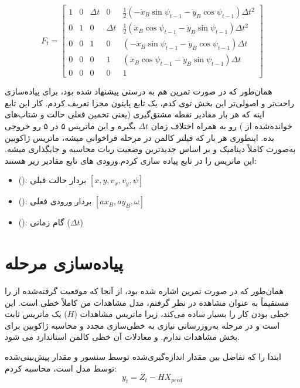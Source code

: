 \documentclass[12pt,a4paper]{article}
\begin{document}
$$F_t = \begin{bmatrix}
	1 & 0 & \Delta t & 0 & \frac{1}{2}(-\ddot{x}_B\sin\psi_{t-1} - \ddot{y}_B\cos\psi_{t-1})\Delta t^2 \\
	0 & 1 & 0 & \Delta t & \frac{1}{2}(\ddot{x}_B\cos\psi_{t-1} - \ddot{y}_B\sin\psi_{t-1})\Delta t^2 \\
	0 & 0 & 1 & 0 & (-\ddot{x}_B\sin\psi_{t-1} - \ddot{y}_B\cos\psi_{t-1})\Delta t \\
	0 & 0 & 0 & 1 & (\ddot{x}_B\cos\psi_{t-1} - \ddot{y}_B\sin\psi_{t-1})\Delta t \\
	0 & 0 & 0 & 0 & 1
\end{bmatrix}$$

همان‌طور که در صورت تمرین هم به درستی پیشنهاد شده بود، برای پیاده‌سازی راحت‌تر و اصولی‌تر این بخش توی کدم، یک تابع پایتون مجزا تعریف کردم. کار این تابع اینه که هر بار مقادیر نقطه مشتق‌گیری (یعنی تخمین فعلی حالت و شتاب‌های خوانده‌شده از ) رو به همراه اختلاف زمان $\Delta t$ بگیره و این ماتریس ۵ در ۵ رو خروجی بده. اینطوری هر بار که فیلتر کالمن در مرحله  فراخوانی میشه، ماتریس ژاکوبین به‌صورت کاملاً دینامیک و بر اساس جدیدترین وضعیت ربات محاسبه و جایگذاری میشه.
این ماتریس را در تابع  پیاده سازی کردم.ورودی های تابع مقادیر زیر هستند:
\begin{itemize}
	\item {} (): بردار حالت قبلی $[x, y, v_x, v_y, \psi]$
	\item {} (): بردار ورودی فعلی $[ax_B, ay_B, \omega]$
	\item {} (): گام زمانی ($\Delta t$)
\end{itemize}

\section{پیاده‌سازی مرحله ‌ }

همان‌طور که در صورت تمرین اشاره شده بود، از آنجا که موقعیت گرفته‌شده از  را مستقیماً به عنوان مشاهده در نظر گرفتم، مدل مشاهدات من کاملاً خطی است. این خطی بودن کار را بسیار ساده می‌کند، زیرا ماتریس مشاهدات ($H$) یک ماتریس ثابت است و در مرحله به‌روزرسانی نیازی به خطی‌سازی مجدد و محاسبه ژاکوبین برای بخش مشاهدات ندارم. و معادلات آن خطی کالمن استاندارد می شود.



ابتدا  را که تفاضل بین مقدار اندازه‌گیری‌شده توسط سنسور و مقدار پیش‌بینی‌شده توسط مدل است، محاسبه کردم:
$$y_t = Z_t - H X_{pred}$$
\end{document}
